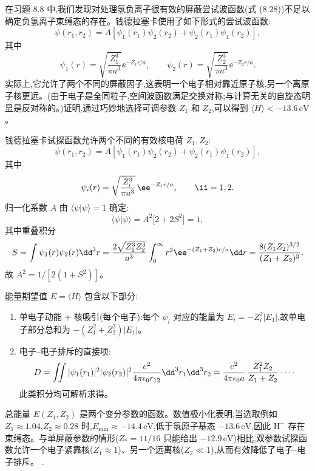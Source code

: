 \begin{question}
在习题 8.8 中,我们发现对处理氢负离子很有效的屏蔽尝试波函数(式 (8.28))不足以确定负氢离子束缚态的存在。钱德拉塞卡使用了如下形式的尝试波函数:
\[
\psi(r_1,r_2)=A[\psi_1(r_1)\psi_2(r_2)+\psi_2(r_1)\psi_1(r_2)],
\]
其中
\[
\psi_1(r)=\sqrt{\frac{Z_1^3}{\pi a^3}}\ee^{-Z_1r/a},\qquad
\psi_2(r)=\sqrt{\frac{Z_2^3}{\pi a^3}}\ee^{-Z_2r/a}.
\]
实际上,它允许了两个不同的屏蔽因子,这表明一个电子相对靠近原子核,另一个离原子核更远。(由于电子是全同粒子,空间波函数满足交换对称;与计算无关的自旋态明显是反对称的。)证明,通过巧妙地选择可调参数 $Z_1$ 和 $Z_2$,可以得到 $\langle H\rangle<-13.6\,\mathrm{eV}$。

\par\smallskip
{}

\end{question}
\begin{solution}
钱德拉塞卡试探函数允许两个不同的有效核电荷 $Z_1,Z_2$:
\[
\psi(r_1,r_2)=A[\psi_1(r_1)\psi_2(r_2)+\psi_2(r_1)\psi_1(r_2)],
\]
其中
\[
\psi_i(r)=\sqrt{Z_i^3\over\pi a^3}\,\ee^{-Z_i r/a},\qquad \ii=1,2.
\]
归一化系数 $A$ 由 $\langle\psi|\psi\rangle=1$ 确定:
\[
\langle\psi|\psi\rangle=A^2\bigl[2+2S^2\bigr]=1,
\]
其中重叠积分
\[
S=\int\psi_1(r)\psi_2(r)\dd^3r
={2\sqrt{Z_1^3Z_2^3}\over a^3}\int_0^\infty r^2 \ee^{-(Z_1+Z_2)r/a}\dd r
={8(Z_1Z_2)^{3/2}\over(Z_1+Z_2)^3}.
\]
故 $A^2=1/[2(1+S^2)]$。

能量期望值 $E=\langle H\rangle$ 包含以下部分:
\begin{enumerate}
\item 单电子动能 + 核吸引(每个电子):每个 $\psi_i$ 对应的能量为 $E_i=-Z_i^2|E_1|$,故单电子部分总和为 $-(Z_1^2+Z_2^2)|E_1|$。
\item 电子--电子排斥的直接项:
\[
D=\iint|\psi_1(r_1)|^2|\psi_2(r_2)|^2{e^2\over4\pi\epsilon_0 r_{12}}\dd^3r_1\dd^3r_2
={e^2\over4\pi\epsilon_0 a}\,{Z_1^2Z_2\over Z_1+Z_2}\cdot\cdots
\]
此类积分均可解析求得。
\end{enumerate}

总能量 $E(Z_1,Z_2)$ 是两个变分参数的函数。数值极小化表明,当选取例如 $Z_1\approx1.04$,$Z_2\approx0.28$ 时,$E_{\min}\approx-14.4\,\mathrm{eV}$,低于氢原子基态 $-13.6\,\mathrm{eV}$,因此 $\mathrm H^-$ 存在束缚态。与单屏蔽参数的情形($Z_*=11/16$ 只能给出 $-12.9\,\mathrm{eV}$)相比,双参数试探函数允许一个电子紧靠核($Z_1\approx1$)、另一个远离核($Z_2\ll1$),从而有效降低了电子--电子排斥。
.
\end{solution}

